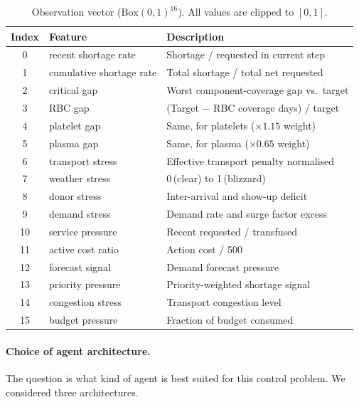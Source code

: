 \begin{table}[htbp]
\centering
\caption{Observation vector ($\text{Box}(0,1)^{16}$).  All values are
         clipped to $[0,1]$.}
\label{tab:obs-space}
\small
\begin{tabular}{@{}clp{6.4cm}@{}}
\toprule
\textbf{Index} & \textbf{Feature} & \textbf{Description} \\
\midrule
0  & recent shortage rate     & Shortage / requested in current step \\
1  & cumulative shortage rate & Total shortage / total net requested \\
2  & critical gap             & Worst component-coverage gap vs.\ target \\
3  & RBC gap                  & (Target $-$ RBC coverage days) / target \\
4  & platelet gap             & Same, for platelets ($\times1.15$ weight) \\
5  & plasma gap               & Same, for plasma ($\times0.65$ weight) \\
6  & transport stress         & Effective transport penalty normalised \\
7  & weather stress           & 0\,(clear) to 1\,(blizzard) \\
8  & donor stress             & Inter-arrival and show-up deficit \\
9  & demand stress            & Demand rate and surge factor excess \\
10 & service pressure         & Recent requested / transfused \\
11 & active cost ratio        & Action cost / 500 \\
12 & forecast signal          & Demand forecast pressure \\
13 & priority pressure        & Priority-weighted shortage signal \\
14 & congestion stress        & Transport congestion level \\
15 & budget pressure          & Fraction of budget consumed \\
\bottomrule
\end{tabular}
\end{table}

\paragraph{Choice of agent architecture.}

The question is what kind of agent is best suited for this control problem.
We considered three architectures.

